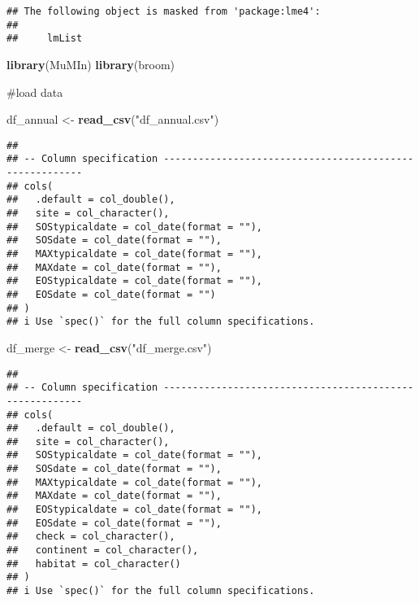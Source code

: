 \documentclass[
]{article}
\newenvironment{Shaded}{\begin{snugshade}}{\end{snugshade}}
\newcommand{\KeywordTok}[1]{\textcolor[rgb]{0.13,0.29,0.53}{\textbf{#1}}}
\newcommand{\NormalTok}[1]{#1}
\newcommand{\StringTok}[1]{\textcolor[rgb]{0.31,0.60,0.02}{#1}}
\begin{document}
\begin{verbatim}
## The following object is masked from 'package:lme4':
## 
##     lmList
\end{verbatim}

\begin{Shaded}
\begin{Highlighting}[]
\KeywordTok{library}\NormalTok{(MuMIn)}
\KeywordTok{library}\NormalTok{(broom)}
\end{Highlighting}
\end{Shaded}

\#load data

\begin{Shaded}
\begin{Highlighting}[]
\NormalTok{df_annual <-}\StringTok{ }\KeywordTok{read_csv}\NormalTok{(}\StringTok{"df_annual.csv"}\NormalTok{)}
\end{Highlighting}
\end{Shaded}

\begin{verbatim}
## 
## -- Column specification --------------------------------------------------------
## cols(
##   .default = col_double(),
##   site = col_character(),
##   SOStypicaldate = col_date(format = ""),
##   SOSdate = col_date(format = ""),
##   MAXtypicaldate = col_date(format = ""),
##   MAXdate = col_date(format = ""),
##   EOStypicaldate = col_date(format = ""),
##   EOSdate = col_date(format = "")
## )
## i Use `spec()` for the full column specifications.
\end{verbatim}

\begin{Shaded}
\begin{Highlighting}[]
\NormalTok{df_merge <-}\StringTok{ }\KeywordTok{read_csv}\NormalTok{(}\StringTok{"df_merge.csv"}\NormalTok{)}
\end{Highlighting}
\end{Shaded}

\begin{verbatim}
## 
## -- Column specification --------------------------------------------------------
## cols(
##   .default = col_double(),
##   site = col_character(),
##   SOStypicaldate = col_date(format = ""),
##   SOSdate = col_date(format = ""),
##   MAXtypicaldate = col_date(format = ""),
##   MAXdate = col_date(format = ""),
##   EOStypicaldate = col_date(format = ""),
##   EOSdate = col_date(format = ""),
##   check = col_character(),
##   continent = col_character(),
##   habitat = col_character()
## )
## i Use `spec()` for the full column specifications.
\end{verbatim}
\end{document}
